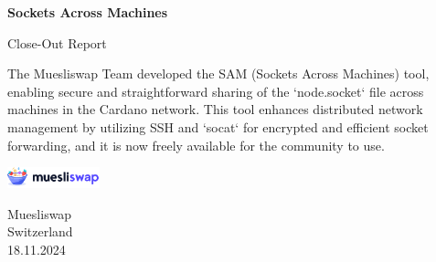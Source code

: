 \begin{titlepage}
   \begin{center}
       \vspace*{1cm}

       \Huge
       \textbf{Sockets Across Machines}

       \vspace{0.5cm}
       \Large
            Close-Out Report
       \vspace{1.5cm}

       \vfill
            
       The Muesliswap Team developed the SAM (Sockets Across Machines) tool, enabling secure and straightforward sharing of the `node.socket` file across machines in the Cardano network. This tool enhances distributed network management by utilizing SSH and `socat` for encrypted and efficient socket forwarding, and it is now freely available for the community to use.

       \vspace{0.8cm}
     
       \includegraphics[width=0.2\textwidth]{muesliswap_logo.png}
            
       Muesliswap\\
       Switzerland\\
       18.11.2024
            
   \end{center}
\end{titlepage}
